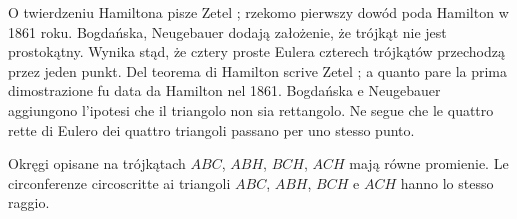 O twierdzeniu Hamiltona pisze Zetel \cite[s. 65]{zetel_2020}; rzekomo pierwszy dowód poda Hamilton w 1861 roku. Bogdańska, Neugebauer \cite[s. 86]{neugebauer_2018} dodają założenie, że trójkąt nie jest prostokątny. Wynika stąd, że cztery proste Eulera czterech trójkątów przechodzą przez jeden punkt. %
Del teorema di Hamilton scrive Zetel \cite[p. 65]{zetel_2020}; a quanto pare la prima dimostrazione fu data da Hamilton nel 1861. Bogdańska e Neugebauer \cite[p. 86]{neugebauer_2018} aggiungono l'ipotesi che il triangolo non sia rettangolo. Ne segue che le quattro rette di Eulero dei quattro triangoli passano per uno stesso punto. %

\begin{corollary}
    Okręgi opisane na trójkątach $ABC$, $ABH$, $BCH$, $ACH$ mają równe promienie. %
    Le circonferenze circoscritte ai triangoli $ABC$, $ABH$, $BCH$ e $ACH$ hanno lo stesso raggio. %
\end{corollary}

%